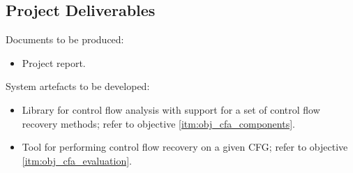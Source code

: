 
\subsection{Project Deliverables}

Documents to be produced:

\begin{itemize}
	\item Project report.
\end{itemize}

System artefacts to be developed:

\begin{itemize}
	\item Library for control flow analysis with support for a set of control flow recovery methods; refer to objective \ref{itm:obj_cfa_components}.
	\item Tool for performing control flow recovery on a given CFG; refer to objective \ref{itm:obj_cfa_evaluation}.
\end{itemize}
